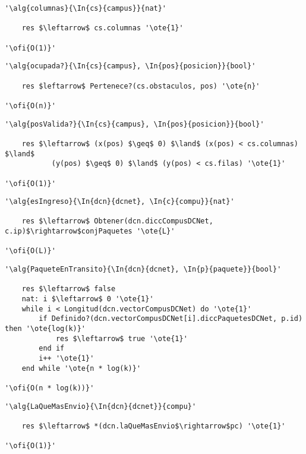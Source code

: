 \begin{lstlisting}[mathescape]
'\alg{columnas}{\In{cs}{campus}}{nat}'

	res $\leftarrow$ cs.columnas '\ote{1}'

'\ofi{O(1)}'
\end{lstlisting}

\begin{lstlisting}[mathescape]
'\alg{ocupada?}{\In{cs}{campus}, \In{pos}{posicion}}{bool}'

	res $leftarrow$ Pertenece?(cs.obstaculos, pos) '\ote{n}'

'\ofi{O(n)}'
\end{lstlisting}

\begin{lstlisting}[mathescape]
'\alg{posValida?}{\In{cs}{campus}, \In{pos}{posicion}}{bool}'

	res $\leftarrow$ (x(pos) $\geq$ 0) $\land$ (x(pos) < cs.columnas) $\land$ 
	       (y(pos) $\geq$ 0) $\land$ (y(pos) < cs.filas) '\ote{1}'

'\ofi{O(1)}'
\end{lstlisting}

\begin{lstlisting}[mathescape]
'\alg{esIngreso}{\In{dcn}{dcnet}, \In{c}{compu}}{nat}'

	res $\leftarrow$ Obtener(dcn.diccCompusDCNet, c.ip)$\rightarrow$conjPaquetes '\ote{L}'

'\ofi{O(L)}'
\end{lstlisting}

\begin{lstlisting}[mathescape]
'\alg{PaqueteEnTransito}{\In{dcn}{dcnet}, \In{p}{paquete}}{bool}'

	res $\leftarrow$ false
	nat: i $\leftarrow$ 0 '\ote{1}'
	while i < Longitud(dcn.vectorCompusDCNet) do '\ote{1}'
		if Definido?(dcn.vectorCompusDCNet[i].diccPaquetesDCNet, p.id) then '\ote{log(k)}'
			res $\leftarrow$ true '\ote{1}'
		end if
		i++ '\ote{1}'
	end while '\ote{n * log(k)}'

'\ofi{O(n * log(k))}'
\end{lstlisting}

\begin{lstlisting}[mathescape]
'\alg{LaQueMasEnvio}{\In{dcn}{dcnet}}{compu}'

	res $\leftarrow$ *(dcn.laQueMasEnvio$\rightarrow$pc) '\ote{1}'

'\ofi{O(1)}'
\end{lstlisting}


